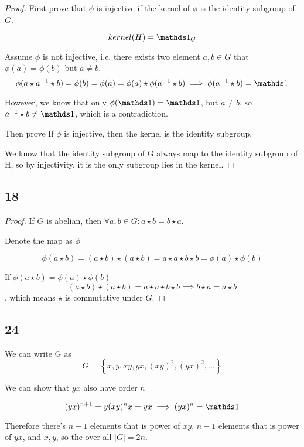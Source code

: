 \begin{proof}
	First prove that $\phi$ is injective if the kernel of $\phi$ is the identity subgroup of $G$.

	$$
		kernel(H) = \one_G
	$$

	Assume $\phi$ is not injective, i.e. there exists two element $a,b \in G$ that $\phi(a) = \phi(b)$ but $a\neq b$.
	$$
		\phi(a \star a^{-1} \star b) = \phi(b) = \phi(a) = \phi(a) \star \phi(a^{-1} \star b) \implies \phi(a^{-1} \star b) = \one
	$$

	However, we know that only $\phi(\one) = \one$, but $a\neq b$, so $a^{-1} \star b \neq \one$, which is a contradiction.

	Then prove If $\phi$ is injective, then the kernel is the identity subgroup.

	We know that the identity subgroup of G always map to the identity subgroup of H,
	so by injectivity, it is the only subgroup lies in the kernel.


\end{proof}

\subsection*{18}

\begin{proof}
	If $G$ is abelian, then $\forall a,b \in G: a \star b = b \star a$.

	Denote the map as $\phi$

	$$
		\phi(a \star b) = (a \star b) \star (a \star b) = a \star a \star b \star b = \phi(a) \star \phi(b)
	$$

	If $\phi(a \star b) = \phi(a) \star \phi(b)$
	$$
		(a \star b)\star(a \star b) = a \star a \star b \star b \implies b \star a = a \star b
	$$, which means $\star$ is commutative under $G$.

\end{proof}

\subsection*{24}

We can write G as
$$
	G = \left\{ x, y, xy, yx, (xy)^2, (yx)^2 , ... \right\}
$$

We can show that $yx$ also have order $n$

$$
	(yx)^{n+1} = y(xy)^nx=yx \implies (yx)^n = \one
$$

Therefore there's $n-1$ elements that is power of $xy$,
$n-1$ elements that is power of $yx$, and $x,y$, so the over all $|G|=2n$.

